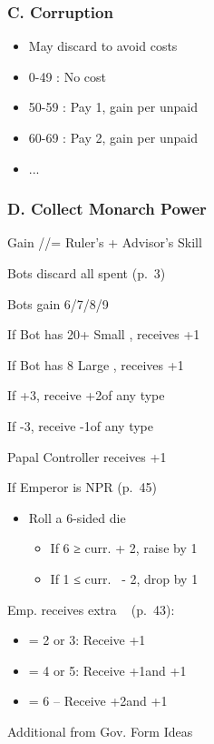 \documentclass[10pt]{article}
\begin{document}
\subsubsection*{C. Corruption}
\begin{itemize}
	\item May discard \ducats to avoid costs
	\item 0-49 \ducats: No cost
	\item 50-59 \ducats: Pay 1\adminpower, gain \interest per unpaid \adminpower
	\item 60-69 \ducats: Pay 2\adminpower, gain \interest per unpaid \adminpower
	\item ...
\end{itemize}

\subsubsection*{D. Collect Monarch Power}
\begin{itemize}
	\item Gain \adminpower/\diplopower/\milpower = Ruler's + Advisor's Skill
	{\botrules
	\item Bots discard all spent \botpower (p.~3)
	\item Bots gain 6/7/8/9 \botpower
	\item If Bot has 20+ Small \towns, receives +1\botpower
	\item If Bot has 8 Large \towns, receives +1\botpower
	}
	\item If +3\stability, receive +2\monarchpower of any type
	\item If -3\stability, receive -1\monarchpower of any type
	\item Papal Controller receives +1\diplopower~
	\item If Emperor is NPR (p.~45) 
	\begin{itemize}
		\item Roll a 6-sided die
		\begin{itemize}
			\item If 6  ≥ curr. \authority + 2, raise \authority by 1
			\item If 1  ≤ curr. \authority~- 2, drop \authority by 1
		\end{itemize}
	\end{itemize}
	\item Emp. receives extra \monarchpower~ (p.~43):
	\begin{itemize}
		\item \authority = 2 or 3: Receive +1\diplopower
		\item \authority = 4 or 5: Receive +1\diplopower and +1\milpower
		\item \authority = 6 – Receive +2\diplopower and +1\milpower
	\end{itemize}
  \item Additional \monarchpower from Gov. Form Ideas
\end{itemize}
\end{document}
